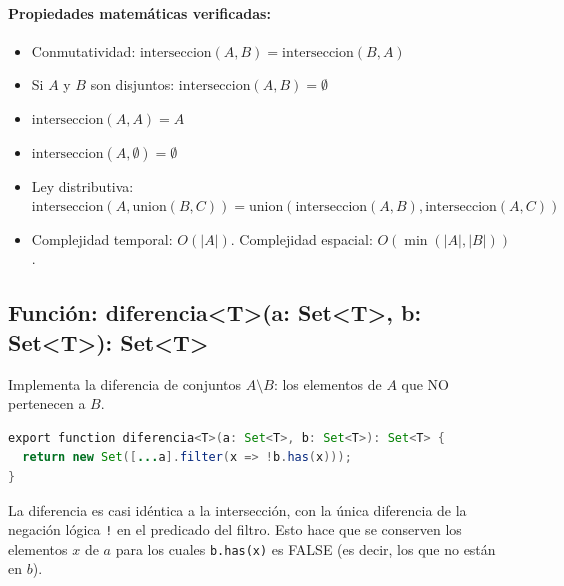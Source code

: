 \documentclass[11pt,a4paper]{article}
\begin{document}
\paragraph{Propiedades matemáticas verificadas:}
\begin{itemize}[noitemsep]
    \item Conmutatividad: $\text{interseccion}(A,B) = \text{interseccion}(B,A)$
    \item Si $A$ y $B$ son disjuntos: $\text{interseccion}(A,B) = \emptyset$
    \item $\text{interseccion}(A,A) = A$
    \item $\text{interseccion}(A,\emptyset) = \emptyset$
    \item Ley distributiva: $\text{interseccion}(A, \text{union}(B,C)) = \text{union}(\text{interseccion}(A,B), \text{interseccion}(A,C))$
    \item Complejidad temporal: $O(|A|)$. Complejidad espacial: $O(\min(|A|,|B|))$.
\end{itemize}

\subsection{Función: diferencia\textless{}T\textgreater{}(a: Set\textless{}T\textgreater{}, b: Set\textless{}T\textgreater{}): Set\textless{}T\textgreater{}}
Implementa la diferencia de conjuntos $A \setminus B$: los elementos de $A$ que NO pertenecen a $B$.

\begin{lstlisting}[language=Java, caption={operations.ts - función diferencia}]
export function diferencia<T>(a: Set<T>, b: Set<T>): Set<T> {
  return new Set([...a].filter(x => !b.has(x)));
}
\end{lstlisting}

La diferencia es casi idéntica a la intersección, con la única diferencia de la negación lógica \texttt{!} en el predicado del filtro. Esto hace que se conserven los elementos $x$ de $a$ para los cuales \texttt{b.has(x)} es FALSE (es decir, los que no están en $b$).
\end{document}
